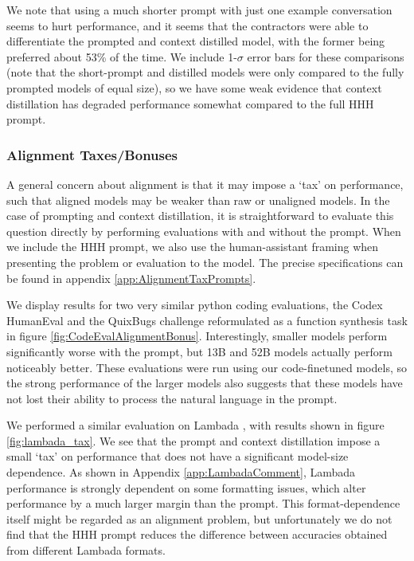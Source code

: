 We note that using a much shorter prompt with just one example conversation seems to hurt performance, and it seems that the contractors were able to differentiate the prompted and context distilled model, with the former being preferred about 53\% of the time.  We include 1-$\sigma$ error bars for these comparisons (note that the short-prompt and distilled models were only compared to the fully prompted models of equal size), so we have some weak evidence that context distillation has degraded performance somewhat compared to the full HHH prompt.

\subsubsection{Alignment Taxes/Bonuses}
\label{sec:AlignmentTax}

A general concern about alignment is that it may impose a `tax' on performance, such that aligned models may be weaker than raw or unaligned models.  In the case of prompting and context distillation, it is straightforward to evaluate this question directly by performing evaluations with and without the prompt.  When we include the HHH prompt, we also use the human-assistant framing when presenting the problem or evaluation to the model.  The precise specifications can be found in appendix \ref{app:AlignmentTaxPrompts}.

We display results for two very similar python coding evaluations, the Codex HumanEval \cite{chen2021evaluating} and the QuixBugs challenge reformulated as a function synthesis task \cite{10.1145/3135932.3135941} in figure \ref{fig:CodeEvalAlignmentBonus}.   Interestingly, smaller models perform significantly worse with the prompt, but 13B and 52B models actually perform noticeably better.  These evaluations were run using our code-finetuned models, so the strong performance of the larger models also suggests that these models have not lost their ability to process the natural language in the prompt. 

We performed a similar evaluation on Lambada \cite{paperno2016lambada}, with results shown in figure \ref{fig:lambada_tax}.  We see that the prompt and context distillation impose a small `tax' on performance that does not have a significant model-size dependence.   As shown in Appendix \ref{app:LambadaComment}, Lambada performance is strongly dependent on some formatting issues, which alter performance by a much larger margin than the prompt.  This format-dependence itself might be regarded as an alignment problem, but unfortunately we do not find that the HHH prompt reduces the difference between accuracies obtained from different Lambada formats.

